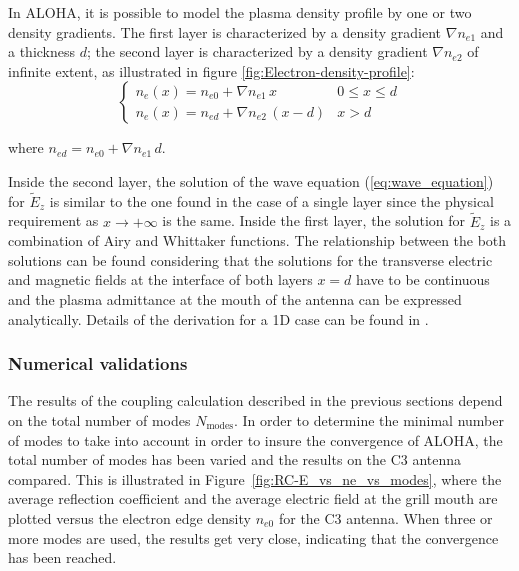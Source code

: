 In ALOHA, it is possible to model the plasma density profile by one or two density gradients. The first layer is characterized by a density gradient $\nabla n_{e1}$ and a thickness $d$; the second layer is characterized by a density gradient $\nabla n_{e2}$ of infinite extent, as illustrated in figure \ref{fig:Electron-density-profile}: 
\begin{equation}
\left\{ \begin{array}{ll}
n_{e}\left(x\right)=n_{e0}+\nabla n_{e1}\, x & 0\leq x\leq d\\
n_{e}\left(x\right)=n_{ed}+\nabla n_{e2}\,\left(x-d\right) & x>d\end{array}\right.\label{eq:density_profile}
\end{equation}

where $n_{ed}=n_{e0}+\nabla n_{e1}\, d$.


Inside the second layer, the solution of the wave equation (\ref{eq:wave_equation}) for $\tilde{E}_{z}$ is similar to the one found in the case of a single layer since the physical requirement as $x\rightarrow+\infty$ is the same. Inside the first layer, the solution for $\tilde{E}_{z}$ is a combination of Airy and Whittaker functions. The relationship between the both solutions can be found considering that the solutions for the transverse electric and magnetic fields at the interface of both layers $x=d$ have to be continuous and the plasma admittance at the mouth of the antenna can be expressed analytically. Details of the derivation for a 1D case can be found in .


\subsubsection{Numerical validations}\label{sec:numerical_considerations}

The results of the coupling calculation described in the previous sections depend on the total number of modes $N_{\mbox{modes}}$. In order to determine the minimal number of modes to take into account in order to insure the convergence of ALOHA, the total number of modes has been varied and the results on the C3 antenna compared. This is illustrated in Figure~\ref{fig:RC-E_vs_ne_vs_modes}, where the average reflection coefficient and the average electric field at the grill mouth are plotted versus the electron edge density $n_{e0}$ for the C3 antenna. When three or more modes are used, the results get very
close, indicating that the convergence has been reached. 

